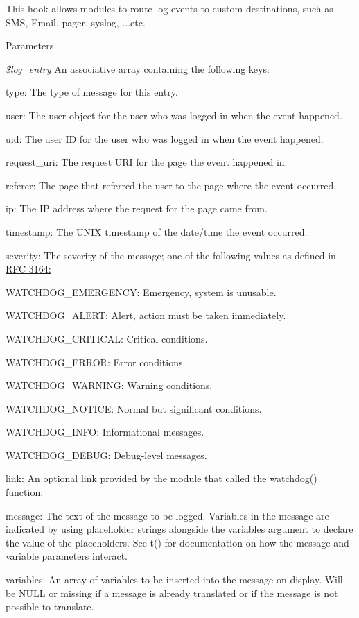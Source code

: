 This hook allows modules to route log events to custom destinations, such as SMS, Email, pager, syslog, ...etc.


\begin{DoxyParams}{Parameters}
\item[{\em \$log\_\-entry}]An associative array containing the following keys:
\begin{DoxyItemize}
\item type: The type of message for this entry.
\item user: The user object for the user who was logged in when the event happened.
\item uid: The user ID for the user who was logged in when the event happened.
\item request\_\-uri: The request URI for the page the event happened in.
\item referer: The page that referred the user to the page where the event occurred.
\item ip: The IP address where the request for the page came from.
\item timestamp: The UNIX timestamp of the date/time the event occurred.
\item severity: The severity of the message; one of the following values as defined in \hyperlink{}{RFC 3164: }
\begin{DoxyItemize}
\item WATCHDOG\_\-EMERGENCY: Emergency, system is unusable.
\item WATCHDOG\_\-ALERT: Alert, action must be taken immediately.
\item WATCHDOG\_\-CRITICAL: Critical conditions.
\item WATCHDOG\_\-ERROR: Error conditions.
\item WATCHDOG\_\-WARNING: Warning conditions.
\item WATCHDOG\_\-NOTICE: Normal but significant conditions.
\item WATCHDOG\_\-INFO: Informational messages.
\item WATCHDOG\_\-DEBUG: Debug-\/level messages.
\end{DoxyItemize}
\item link: An optional link provided by the module that called the \hyperlink{bootstrap_8inc_acb7338e6740302727043d64e3ae1257b}{watchdog()} function.
\item message: The text of the message to be logged. Variables in the message are indicated by using placeholder strings alongside the variables argument to declare the value of the placeholders. See t() for documentation on how the message and variable parameters interact.
\item variables: An array of variables to be inserted into the message on display. Will be NULL or missing if a message is already translated or if the message is not possible to translate. 
\end{DoxyItemize}\end{DoxyParams}
